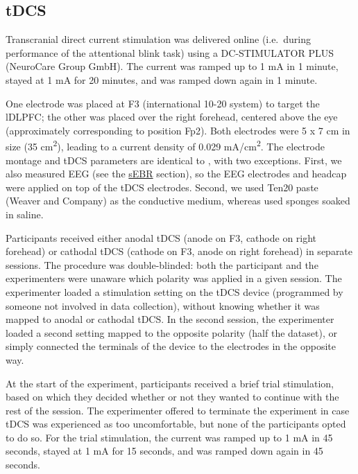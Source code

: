 \documentclass[11pt,english,]{memoir}
\begin{document}
\hypertarget{AB_sEBR-tDCS}{%
\subsection{tDCS}\label{AB_sEBR-tDCS}}

Transcranial direct current stimulation was delivered online (i.e.~during performance of the attentional blink task) using a DC-STIMULATOR PLUS (NeuroCare Group GmbH). The current was ramped up to 1 mA in 1 minute, stayed at 1 mA for 20 minutes, and was ramped down again in 1 minute.

One electrode was placed at F3 (international 10-20 system) to target the lDLPFC; the other was placed over the right forehead, centered above the eye (approximately corresponding to position Fp2). Both electrodes were 5 x 7 cm in size (35 cm\textsuperscript{2}), leading to a current density of 0.029 mA/cm\textsuperscript{2}. The electrode montage and tDCS parameters are identical to \textcite{London2015}, with two exceptions. First, we also measured EEG (see the \protect\hyperlink{AB_sEBR-sEBR}{sEBR} section), so the EEG electrodes and headcap were applied on top of the tDCS electrodes. Second, we used Ten20 paste (Weaver and Company) as the conductive medium, whereas \textcite{London2015} used sponges soaked in saline.

Participants received either anodal tDCS (anode on F3, cathode on right forehead) or cathodal tDCS (cathode on F3, anode on right forehead) in separate sessions. The procedure was double-blinded: both the participant and the experimenters were unaware which polarity was applied in a given session. The experimenter loaded a stimulation setting on the tDCS device (programmed by someone not involved in data collection), without knowing whether it was mapped to anodal or cathodal tDCS. In the second session, the experimenter loaded a second setting mapped to the opposite polarity (half the dataset), or simply connected the terminals of the device to the electrodes in the opposite way.

At the start of the experiment, participants received a brief trial stimulation, based on which they decided whether or not they wanted to continue with the rest of the session. The experimenter offered to terminate the experiment in case tDCS was experienced as too uncomfortable, but none of the participants opted to do so. For the trial stimulation, the current was ramped up to 1 mA in 45 seconds, stayed at 1 mA for 15 seconds, and was ramped down again in 45 seconds.
\end{document}
